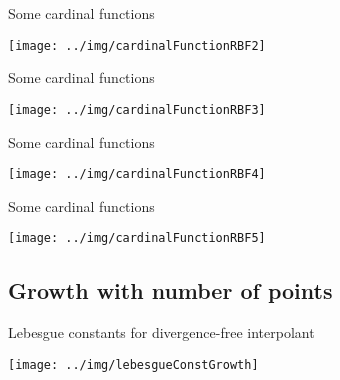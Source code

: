 \documentclass{beamer}
\begin{document}
\begin{frame}{Some cardinal functions}
  \begin{center}
    \texttt{[image: ../img/cardinalFunctionRBF2]}
  \end{center}
\end{frame}

\begin{frame}{Some cardinal functions}
  \begin{center}
    \texttt{[image: ../img/cardinalFunctionRBF3]}
  \end{center}
\end{frame}

\begin{frame}{Some cardinal functions}
  \begin{center}
    \texttt{[image: ../img/cardinalFunctionRBF4]}
  \end{center}
\end{frame}

\begin{frame}{Some cardinal functions}
  \begin{center}
    \texttt{[image: ../img/cardinalFunctionRBF5]}
  \end{center}
\end{frame}

\subsection{Growth with number of points}
\begin{frame}{Lebesgue constants for divergence-free interpolant}
  \begin{center}
    \texttt{[image: ../img/lebesgueConstGrowth]}
  \end{center}
\end{frame}
\end{document}
